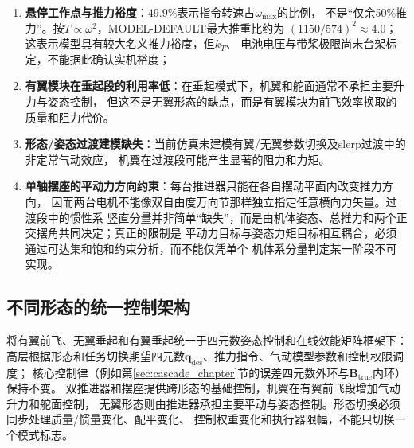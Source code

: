 \begin{enumerate}[label=(\arabic*)]
    \item \textbf{悬停工作点与推力裕度}：$49.9\%$表示指令转速占$\omega_{\max}$的比例，
          不是“仅余50\%推力”。按$T\propto\omega^2$，MODEL-DEFAULT最大推重比约为
          $(1150/574)^2\approx4.0$；这表示模型具有较大名义推力裕度，但$k_T$、
          电池电压与带桨极限尚未台架标定，不能据此确认实机裕度；
    \item \textbf{有翼模块在垂起段的利用率低}：在垂起模式下，机翼和舵面通常不承担主要升力与姿态控制，
          但这不是无翼形态的缺点，而是有翼模块为前飞效率换取的质量和阻力代价。
    \item \textbf{形态/姿态过渡建模缺失}：当前仿真未建模有翼/无翼参数切换及slerp过渡中的非定常气动效应，
          机翼在过渡段可能产生显著的阻力和力矩。
    \item \textbf{单轴摆座的平动力方向约束}：每台推进器只能在各自摆动平面内改变推力方向，
          因而两台电机不能像双自由度万向节那样独立指定任意横向力矢量。过渡段中的惯性系
          竖直分量并非简单“缺失”，而是由机体姿态、总推力和两个正交摆角共同决定；真正的限制是
          平动力目标与姿态力矩目标相互耦合，必须通过可达集和饱和约束分析，而不能仅凭单个
          机体系分量判定某一阶段不可实现。
\end{enumerate}

\subsection{不同形态的统一控制架构}

将有翼前飞、无翼垂起和有翼垂起统一于四元数姿态控制和在线效能矩阵框架下：
高层根据形态和任务切换期望四元数$\mathbf{q}_{\text{des}}$、推力指令、气动模型参数和控制权限调度；
核心控制律（例如第\ref{sec:cascade_chapter}节的误差四元数外环与$\mathbf{B}_{\text{true}}$内环）保持不变。
双推进器和摆座提供跨形态的基础控制，机翼在有翼前飞段增加气动升力和舵面控制，
无翼形态则由推进器承担主要平动与姿态控制。形态切换必须同步处理质量/惯量变化、配平变化、
控制权重变化和执行器限幅，不能只切换一个模式标志。
